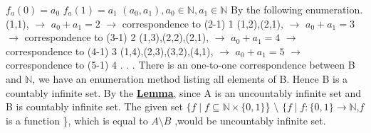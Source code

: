 \documentclass[11pt]{article}
\begin{document}
\newline \newline\noindent  \newline \newline
$f_a(0) = a_0$ \newline
$f_a(1) = a_1$  \space \space \rightarrow \space  \space $(a_0,a_1), a_0 \in \mathbb{N},a_1 \in \mathbb{N}$  \newline  \newline  \newline 
\noindent
By the following enumeration. \newline \newline
\noindent
(1,1), \space \space \space \space \space \space \space \space \space \space \space \space\space \space \space \space \space \space \space \space \space \space \space \spacespace \space \space \space \space \space \space \space \space  $\rightarrow$ \space \space \space $a_0 + a_1 = 2$   \space  $\rightarrow$ \space \space correspondence to (2-1) 1
\newline (1,2),(2,1),  \space \space \space \space \space \space \space \space \space \space \space \space\space \space \space \space \space \space \space \space \space \space \space \space    $\rightarrow$ \space \space \space $a_0 + a_1 = 3$ \space  $\rightarrow$ \space \space correspondence to (3-1) 2
\newline (1,3),(2,2),(2,1), \space \space \space \space \space \space \space \space \space \space \space \space\space \space \space \space \space   $\rightarrow$ \space \space \space $a_0 + a_1 = 4$ \space  $\rightarrow$ \space \space correspondence to (4-1) 3
\newline (1,4),(2,3),(3,2),(4,1), \space \space \space \space \space \space \space \space \space \space   $\rightarrow$ \space \space \space $a_0 + a_1 = 5$ \space  $\rightarrow$ \space \space correspondence to (5-1) 4
\newline
. \newline
. \newline
. \newline \newline \newline 
\noindent
There is an one-to-one correspondence between B and $\mathbb{N}$, we have an enumeration method listing all elements of B. Hence B is a countably infinite set. \newline \newline \newline 
\noindent
By the \textbf{\underline{Lemma}}, since A is an uncountably infinite set and
B is countably infinite set. The given set $\{f\mid f\subseteq \mathbb{N} \times \{0,1\}$\} $\setminus$
    $\{f \mid f:\{0,1\} \xrightarrow{} \mathbb{N}$,$f$ is a function \}, which is equal to $A \setminus B$ ,would be uncountably infinite set.
\end{document}
